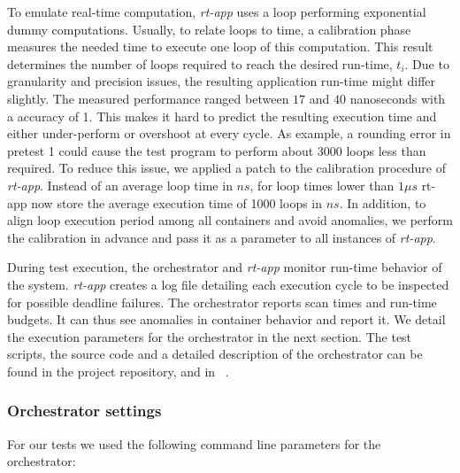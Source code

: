 \documentclass[]{scrartcl}
\begin{document}
To emulate real-time computation, \emph{rt-app} uses a loop performing exponential dummy computations. 
Usually, to relate loops to time, a calibration phase measures the needed time to execute one loop of this computation.
This result determines the number of loops required to reach the desired run-time, $t_i$. 
Due to granularity and precision issues, the resulting application run-time might differ slightly.
The measured performance ranged between $17$ and $40$ nanoseconds with a accuracy of 1.
This makes it hard to predict the resulting execution time and either under-perform or overshoot at every cycle.
As example, a rounding error in pretest 1 could cause the test program to perform about 3000 loops less than required.
To reduce this issue, we applied a patch to the calibration procedure of \emph{rt-app}. 
Instead of an average loop time in $ns$, for loop times lower than $1\mu s$ rt-app now store the average execution time of 1000 loops in $ns$.
In addition, to align loop execution period among all containers and avoid anomalies, we perform  the calibration  in advance and pass it as a parameter to all instances of \emph{rt-app}.

During test execution, the orchestrator and \emph{rt-app} monitor run-time behavior of the system.
\emph{rt-app} creates a log file detailing each execution cycle to be inspected for possible deadline failures.
The orchestrator reports scan times and run-time budgets. 
It can thus see anomalies in container behavior and report it.
We detail the execution parameters for the orchestrator in the next section.
The test scripts, the source code and a detailed description of the orchestrator can be found in the project repository, and in ~\cite{homep01}.

\subsubsection{Orchestrator settings}
\label{sub:orchset}

For our tests we used the following command line parameters for the orchestrator:
\end{document}
